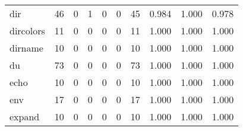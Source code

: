 \begin{longtable}{lp{1.3cm}p{1.3cm}p{1.3cm}p{1.3cm}p{1.3cm}p{1.3cm}p{1.3cm}p{1.3cm}p{1.3cm}}
dir       &                     46 &                                             0 &                                            1 &                                           0 &                                            0 &                                         45 &                                0.984 &                                  1.000 &                                0.978 \\
dircolors &                     11 &                                             0 &                                            0 &                                           0 &                                            0 &                                         11 &                                1.000 &                                  1.000 &                                1.000 \\
dirname   &                     10 &                                             0 &                                            0 &                                           0 &                                            0 &                                         10 &                                1.000 &                                  1.000 &                                1.000 \\
du        &                     73 &                                             0 &                                            0 &                                           0 &                                            0 &                                         73 &                                1.000 &                                  1.000 &                                1.000 \\
echo      &                     10 &                                             0 &                                            0 &                                           0 &                                            0 &                                         10 &                                1.000 &                                  1.000 &                                1.000 \\
env       &                     17 &                                             0 &                                            0 &                                           0 &                                            0 &                                         17 &                                1.000 &                                  1.000 &                                1.000 \\
expand    &                     10 &                                             0 &                                            0 &                                           0 &                                            0 &                                         10 &                                1.000 &                                  1.000 &                                1.000 \\

\end{longtable}
